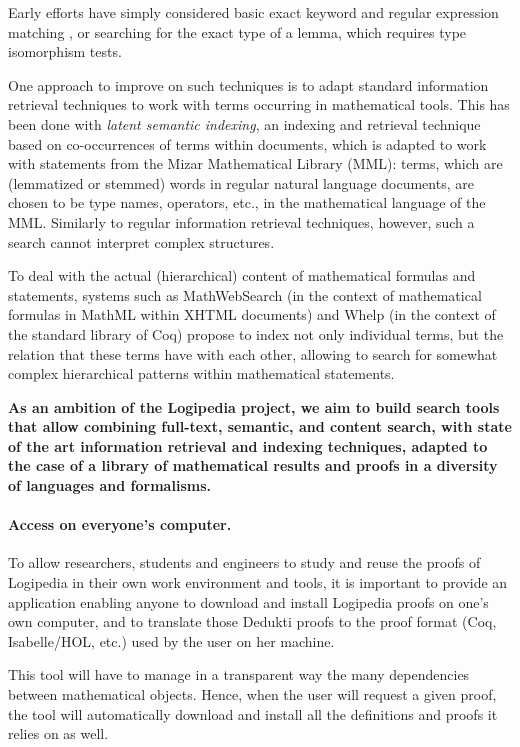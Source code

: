 Early efforts have simply considered
basic exact keyword and regular expression matching 
\cite{DBLP:conf/mkm/BancerekR03}, or searching for the exact type of a lemma,
which requires type isomorphism tests\cite{DBLP:conf/types/Delahaye99}.

One approach to improve on such techniques is to
adapt standard information retrieval techniques to work with terms
occurring in mathematical tools. This has been done\cite{DBLP:conf/mkm/Cairns04}
with \emph{latent semantic indexing}, an
indexing and retrieval technique based on co-occurrences of terms within
documents, which is adapted to work with statements from the Mizar
Mathematical Library (MML): terms, which are (lemmatized or stemmed)
words in regular natural language documents, are chosen to be type names,
operators, etc., in the mathematical language of the MML. Similarly to
regular information retrieval techniques, however, such a search cannot
interpret complex structures.

To deal with the actual (hierarchical) content of mathematical formulas
and statements, systems such as
MathWebSearch\cite{DBLP:conf/aisc/KohlhaseMP12} (in the context of
mathematical formulas in MathML within XHTML documents) and
Whelp\cite{DBLP:conf/types/AspertiGCTZ04} (in the context of the standard
library of Coq) propose to index not only individual terms, but the
relation that these terms have with each other, allowing to search for
somewhat complex hierarchical patterns within mathematical statements.

{\bf As an ambition of the Logipedia project, we aim to build search
  tools that allow combining full-text, semantic, and content search,
  with state of the art information retrieval and indexing techniques,
  adapted to the case of a library of mathematical results and proofs
  in a diversity of languages and formalisms.}

\paragraph*{Access on everyone's computer.}

To allow researchers, students and engineers to study and
reuse the proofs of Logipedia in their own work environment
and tools, it is important to provide an application enabling anyone
to download and install Logipedia proofs on one's own computer, and to
translate those Dedukti proofs to the proof format (Coq, Isabelle/HOL,
etc.) used by the user on her machine.

This tool will have to manage in a transparent way the many
dependencies between mathematical objects. Hence, when the user will
request a given proof, the tool will automatically download and
install all the definitions and proofs it relies on as well.

